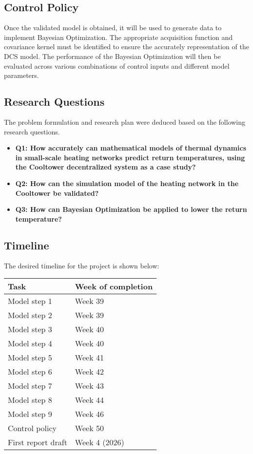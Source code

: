 \subsection{Control Policy}
Once the validated model is obtained, it will be used to generate data to implement Bayesian Optimization. The appropriate acquisition function and covariance kernel must be identified to ensure the accurately representation of the DCS model. The performance of the Bayesian Optimization will then be evaluated across various combinations of control inputs and different model parameters. 

\subsection{Research Questions}
The problem formulation and research plan were deduced based on the following research questions.

\begin{itemize}
    \item \textbf{Q1: How accurately can mathematical models of thermal dynamics in small-scale heating networks predict return temperatures, using the Cooltower decentralized system as a case study?}
    \item \textbf{Q2: How can the simulation model of the heating network in the Cooltower be validated?}
    \item \textbf{Q3: How can Bayesian Optimization be applied to lower the return temperature?}
    
\end{itemize}

\subsection{Timeline}
The desired timeline for the project is shown below:

\begin{table}[h]
\center
\begin{tabular}{l|l}
Task           & Week of completion \\ \hline
Model step 1   & Week 39\footnotemark[1]           \\
Model step 2   & Week 39\footnotemark[1]            \\
Model step 3   & Week 40            \\
Model step 4   & Week 40            \\
Model step 5   & Week 41            \\
Model step 6   & Week 42            \\
Model step 7   & Week 43            \\
Model step 8   & Week 44            \\
Model step 9   & Week 46            \\
Control policy & Week 50           \\
First report draft & Week 4 (2026)
\end{tabular}
\end{table}
